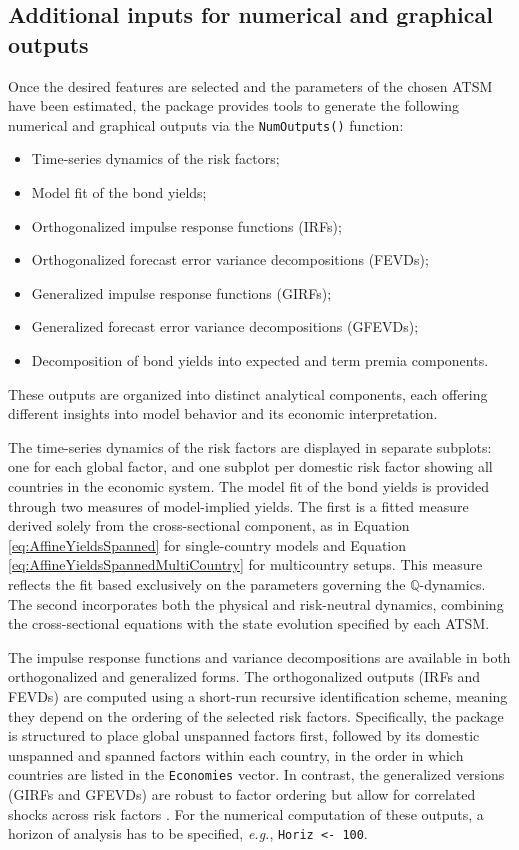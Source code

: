 \subsection{Additional inputs for numerical and graphical outputs}\label{S:SectionNumOut}

Once the desired features are selected and the parameters of the chosen ATSM have been estimated, the  package provides tools to generate the following numerical and graphical outputs
via the \texttt{NumOutputs()} function:

\begin{itemize}
\tightlist
\item
  Time-series dynamics of the risk factors;
\item
  Model fit of the bond yields;
\item
  Orthogonalized impulse response functions (IRFs);
\item
  Orthogonalized forecast error variance decompositions (FEVDs);
\item
  Generalized impulse response functions (GIRFs);
\item
  Generalized forecast error variance decompositions (GFEVDs);
\item
  Decomposition of bond yields into expected and term premia components.
\end{itemize}

These outputs are organized into distinct analytical components, each offering different insights into model behavior and its economic interpretation.

The time-series dynamics of the risk factors are displayed in separate subplots: one for each global factor, and one subplot per domestic risk factor showing all countries in the economic system. The model fit of the bond yields is provided through two measures of model-implied yields. The first is a fitted measure derived solely from the cross-sectional component, as in Equation \eqref{eq:AffineYieldsSpanned} for single-country models and Equation \eqref{eq:AffineYieldsSpannedMultiCountry} for multicountry setups. This measure reflects the fit based exclusively on the parameters governing the \(\mathbb{Q}\)-dynamics. The second incorporates both the physical and risk-neutral dynamics, combining the cross-sectional equations with the state evolution specified by each ATSM.

The impulse response functions and variance decompositions are available in both orthogonalized and generalized forms. The orthogonalized outputs (IRFs and FEVDs) are computed using a short-run recursive identification scheme, meaning they depend on the ordering of the selected risk factors. Specifically, the package is structured to place global unspanned factors first, followed by its domestic unspanned and spanned factors within each country, in the order in which countries are listed in the \texttt{Economies} vector. In contrast, the generalized versions (GIRFs and GFEVDs) are robust to factor ordering but allow for correlated shocks across risk factors \citep{PesaranShin1998}. For the numerical computation of these outputs, a horizon of analysis has to be specified, \emph{e.g.}, \texttt{Horiz\ \textless{}-\ 100}.

